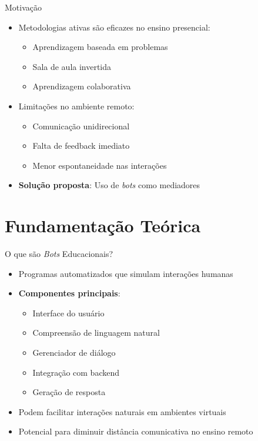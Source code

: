 \documentclass[aspectratio=169]{beamer}
\begin{document}
{\begin{frame}{Motivação}
  \begin{itemize}
  \item Metodologias ativas são eficazes no ensino presencial:
    \begin{itemize}
    \item Aprendizagem baseada em problemas
    \item Sala de aula invertida
    \item Aprendizagem colaborativa
    \end{itemize}
  \item Limitações no ambiente remoto:
    \begin{itemize}
    \item Comunicação unidirecional
    \item Falta de feedback imediato
    \item Menor espontaneidade nas interações
    \end{itemize}
  \item \textbf{Solução proposta}: Uso de \textit{bots} como mediadores
  \end{itemize}
\end{frame}

\section{Fundamentação Teórica}

\begin{frame}{O que são \textit{Bots} Educacionais?}
  \begin{itemize}
  \item Programas automatizados que simulam interações humanas
  \item \textbf{Componentes principais}:
    \begin{itemize}
    \item Interface do usuário
    \item Compreensão de linguagem natural
    \item Gerenciador de diálogo
    \item Integração com backend
    \item Geração de resposta
    \end{itemize}
  \item Podem facilitar interações naturais em ambientes virtuais
  \item Potencial para diminuir distância comunicativa no ensino remoto
  \end{itemize}
\end{frame}

}
\end{document}
